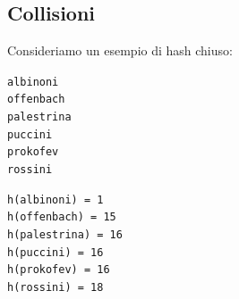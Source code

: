 \documentclass[12pt]{report}
\begin{document}
	\subsection{Collisioni} Consideriamo un esempio di hash chiuso:\\
	\noindent
	\begin{minipage}[c]{0.25\textwidth}
		\raggedright
		\texttt{albinoni}\\[0.5em]
		\texttt{offenbach}\\[0.5em]
		\texttt{palestrina}\\[0.5em]
		\texttt{puccini}\\[0.5em]
		\texttt{prokofev}\\[0.5em]
		\texttt{rossini}
	\end{minipage}\hspace{1cm}%
	\begin{minipage}[c]{0.35\textwidth}
		\raggedright
		\texttt{h(albinoni) = 1}\\[0.5em]
		\texttt{h(offenbach) = 15}\\[0.5em]
		\texttt{h(palestrina) = 16}\\[0.5em]
		\texttt{h(puccini) = 16}\\[0.5em]
		\texttt{h(prokofev) = 16}\\[0.5em]
		\texttt{h(rossini) = 18}
	\end{minipage}\hspace{1cm}%
	 \quad \\
\end{document}
